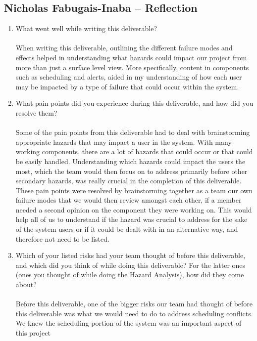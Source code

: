 \documentclass{article}
\begin{document}
\subsection*{Nicholas Fabugais-Inaba -- Reflection}

\begin{enumerate}
  \item What went well while writing this deliverable?\\\\
  When writing this deliverable, outlining the different failure modes and effects 
  helped in understanding what hazards could impact our project from more than just a
  surface level view. More specifically, content in components such as scheduling and
  alerts, aided in my understanding of how each user may be impacted by a type of failure
  that could occur within the system.
  \item What pain points did you experience during this deliverable, and how
  did you resolve them?\\\\
  Some of the pain points from this deliverable had to deal with brainstorming
  appropriate hazards that may impact a user in the system. With many working components,
  there are a lot of hazards that could occur or that could be easily handled. 
  Understanding which hazards could impact the users the most, which the team would then
  focus on to address primarily before other secondary hazards, was really crucial
  in the completion of this deliverable. These pain points were resolved
  by brainstorming together as a team our own failure modes that we would then review
  amongst each other, if a member needed a second opinion on the component they were
  working on. This would help all of us to understand if the hazard was crucial to
  address for the sake of the system users or if it could be dealt with in an alternative
  way, and therefore not need to be listed.
  \item Which of your listed risks had your team thought of before this
  deliverable, and which did you think of while doing this deliverable? For
  the latter ones (ones you thought of while doing the Hazard Analysis), how
  did they come about?
  \\\\
  Before this deliverable, one of the bigger risks our team had thought of before
  this deliverable was what we would need to do to address scheduling conflicts.
  We knew the scheduling portion of the system was an important aspect of this project

\end{enumerate}
\end{document}
